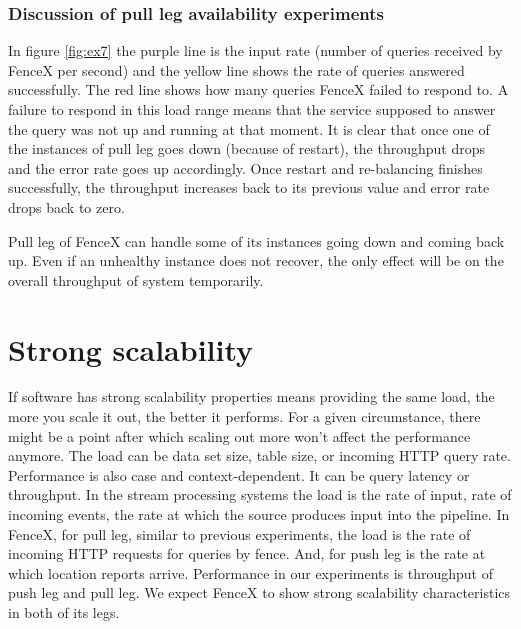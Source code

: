 \documentclass[a4]{report}
\begin{document}
    \clearpage

    \subsubsection{Discussion of pull leg availability experiments}
    In figure \ref{fig:ex7} the purple line is the input rate (number of queries received by FenceX per second) and
    the yellow line shows the rate of queries answered successfully.
    The red line shows how many queries FenceX failed to respond to.
    A failure to respond in this load range means that the service supposed to answer the query was not
    up and running at that moment.
    It is clear that once one of the instances of pull leg goes down (because of restart), the throughput drops and
    the error rate goes up accordingly.
    Once restart and re-balancing finishes successfully, the throughput increases back to its previous value and
    error rate drops back to zero.

    Pull leg of FenceX can handle some of its instances going down and coming back up.
    Even if an unhealthy instance does not recover, the only effect will be on the overall throughput of system temporarily.


    \section{Strong scalability}
    If software has strong scalability properties means providing the same load, the more you scale it out, the better
    it performs.
    For a given circumstance, there might be a point after which scaling out more won't affect the performance anymore.
    The load can be data set size, table size, or incoming HTTP query rate.
    Performance is also case and context-dependent.
    It can be query latency or throughput.
    In the stream processing systems the load is the rate of input, rate of incoming events, the rate at which the source
    produces input into the pipeline.
    In FenceX, for pull leg, similar to previous experiments, the load is the rate of incoming HTTP requests for queries by fence.
    And, for push leg is the rate at which location reports arrive.
    Performance in our experiments is throughput of push leg and pull leg.
    We expect FenceX to show strong scalability characteristics in both of its legs.
\end{document}
